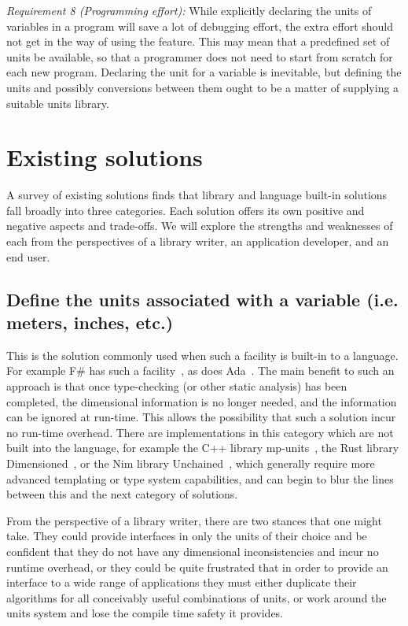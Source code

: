 \documentclass{article}
\begin{document}
\vspace{\baselineskip}
\noindent \emph{Requirement 8 (Programming effort):}
While explicitly declaring the units of variables in a program will save a lot of debugging effort, the extra effort
should not get in the way of using the feature. This may mean that a predefined set of units be available, so that
a programmer does not need to start from scratch for each new program. Declaring the unit for a variable is inevitable,
but defining the units and possibly conversions between them ought to be a matter of supplying a suitable units library.


\section{Existing solutions}
\label{ExistingSolutions}

A survey of existing solutions finds that library and language built-in solutions fall broadly into three categories.
Each solution offers its own positive and negative aspects and trade-offs.
We will explore the strengths and weaknesses of each from the perspectives of a library writer, an application developer, and an end user.

\subsection{Define the units associated with a variable (i.e. meters, inches, etc.)}
\label{static-units}

This is the solution commonly used when such a facility is built-in to a language.
For example F\# has such a facility~\cite{FSharpUnitsofMeasure2020}, as does Ada~\cite{DimensionalityCheckingAda}.
The main benefit to such an approach is that once type-checking (or other static analysis) has been completed,
the dimensional information is no longer needed, and the information can be ignored at run-time.
This allows the possibility that such a solution incur no run-time overhead.
There are implementations in this category which are not built into the language,
for example the C++ library mp-units~\cite{mpunits}, the Rust library Dimensioned~\cite{RustDimensioned}, or the Nim library Unchained~\cite{SciNimUnchained},
which generally require more advanced templating or type system capabilities,
and can begin to blur the lines between this and the next category of solutions.

From the perspective of a library writer, there are two stances that one might take.
They could provide interfaces in only the units of their choice and be confident that they do not have any dimensional inconsistencies and incur no runtime overhead,
or they could be quite frustrated that in order to provide an interface to a wide range of applications they must either duplicate their algorithms for all conceivably useful combinations of units, or work around the units system and lose the compile time safety it provides.
\end{document}
